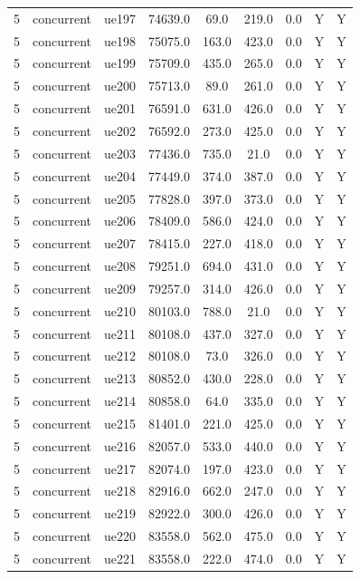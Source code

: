 \begin{table}[ht]
\begin{tabular}{|c|c|c|c|c|c|c|c|c|}
5 & concurrent & ue197 & 74639.0 & 69.0 & 219.0 & 0.0 & Y & Y \\
5 & concurrent & ue198 & 75075.0 & 163.0 & 423.0 & 0.0 & Y & Y \\
5 & concurrent & ue199 & 75709.0 & 435.0 & 265.0 & 0.0 & Y & Y \\
5 & concurrent & ue200 & 75713.0 & 89.0 & 261.0 & 0.0 & Y & Y \\
5 & concurrent & ue201 & 76591.0 & 631.0 & 426.0 & 0.0 & Y & Y \\
5 & concurrent & ue202 & 76592.0 & 273.0 & 425.0 & 0.0 & Y & Y \\
5 & concurrent & ue203 & 77436.0 & 735.0 & 21.0 & 0.0 & Y & Y \\
5 & concurrent & ue204 & 77449.0 & 374.0 & 387.0 & 0.0 & Y & Y \\
5 & concurrent & ue205 & 77828.0 & 397.0 & 373.0 & 0.0 & Y & Y \\
5 & concurrent & ue206 & 78409.0 & 586.0 & 424.0 & 0.0 & Y & Y \\
5 & concurrent & ue207 & 78415.0 & 227.0 & 418.0 & 0.0 & Y & Y \\
5 & concurrent & ue208 & 79251.0 & 694.0 & 431.0 & 0.0 & Y & Y \\
5 & concurrent & ue209 & 79257.0 & 314.0 & 426.0 & 0.0 & Y & Y \\
5 & concurrent & ue210 & 80103.0 & 788.0 & 21.0 & 0.0 & Y & Y \\
5 & concurrent & ue211 & 80108.0 & 437.0 & 327.0 & 0.0 & Y & Y \\
5 & concurrent & ue212 & 80108.0 & 73.0 & 326.0 & 0.0 & Y & Y \\
5 & concurrent & ue213 & 80852.0 & 430.0 & 228.0 & 0.0 & Y & Y \\
5 & concurrent & ue214 & 80858.0 & 64.0 & 335.0 & 0.0 & Y & Y \\
5 & concurrent & ue215 & 81401.0 & 221.0 & 425.0 & 0.0 & Y & Y \\
5 & concurrent & ue216 & 82057.0 & 533.0 & 440.0 & 0.0 & Y & Y \\
5 & concurrent & ue217 & 82074.0 & 197.0 & 423.0 & 0.0 & Y & Y \\
5 & concurrent & ue218 & 82916.0 & 662.0 & 247.0 & 0.0 & Y & Y \\
5 & concurrent & ue219 & 82922.0 & 300.0 & 426.0 & 0.0 & Y & Y \\
5 & concurrent & ue220 & 83558.0 & 562.0 & 475.0 & 0.0 & Y & Y \\
5 & concurrent & ue221 & 83558.0 & 222.0 & 474.0 & 0.0 & Y & Y \\

\end{tabular}
\end{table}
